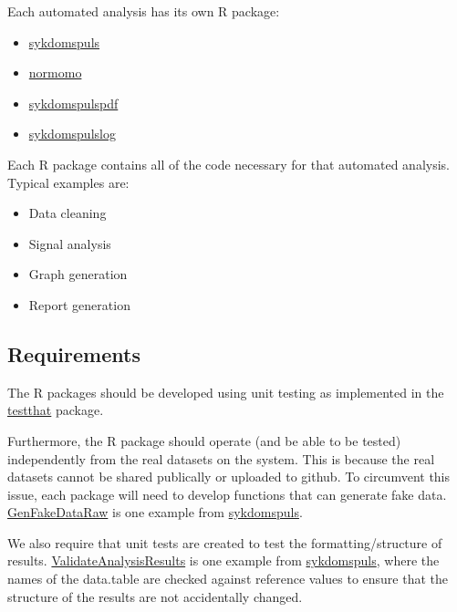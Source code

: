 \documentclass[12pt,]{article}
\providecommand{\tightlist}{%
  \setlength{\itemsep}{0pt}\setlength{\parskip}{0pt}}
\theoremstyle{definition}
\theoremstyle{definition}
\theoremstyle{definition}
\theoremstyle{remark}
\begin{document}
Each automated analysis has its own R package:

\begin{itemize}
\tightlist
\item
  \href{https://folkehelseinstituttet.github.io/dashboards_sykdomspuls/}{sykdomspuls}
\item
  \href{https://folkehelseinstituttet.github.io/dashboards_normomo/}{normomo}
\item
  \href{https://folkehelseinstituttet.github.io/dashboards_sykdomspuls_pdf/}{sykdomspulspdf}
\item
  \href{https://folkehelseinstituttet.github.io/dashboards_sykdomspuls_log/}{sykdomspulslog}
\end{itemize}

Each R package contains all of the code necessary for that automated
analysis. Typical examples are:

\begin{itemize}
\tightlist
\item
  Data cleaning
\item
  Signal analysis
\item
  Graph generation
\item
  Report generation
\end{itemize}

\subsection{Requirements}\label{requirements}

The R packages should be developed using unit testing as implemented in
the \href{http://r-pkgs.had.co.nz/tests.html}{testthat} package.

Furthermore, the R package should operate (and be able to be tested)
independently from the real datasets on the system. This is because the
real datasets cannot be shared publically or uploaded to github. To
circumvent this issue, each package will need to develop functions that
can generate fake data.
\href{https://folkehelseinstituttet.github.io/dashboards_sykdomspuls/reference/GenFakeDataRaw.html}{GenFakeDataRaw}
is one example from
\href{https://folkehelseinstituttet.github.io/dashboards_sykdomspuls/}{sykdomspuls}.

We also require that unit tests are created to test the
formatting/structure of results.
\href{https://folkehelseinstituttet.github.io/dashboards_sykdomspuls/reference/ValidateAnalysisResults.html}{ValidateAnalysisResults}
is one example from
\href{https://folkehelseinstituttet.github.io/dashboards_sykdomspuls/}{sykdomspuls},
where the names of the data.table are checked against reference values
to ensure that the structure of the results are not accidentally
changed.
\end{document}

